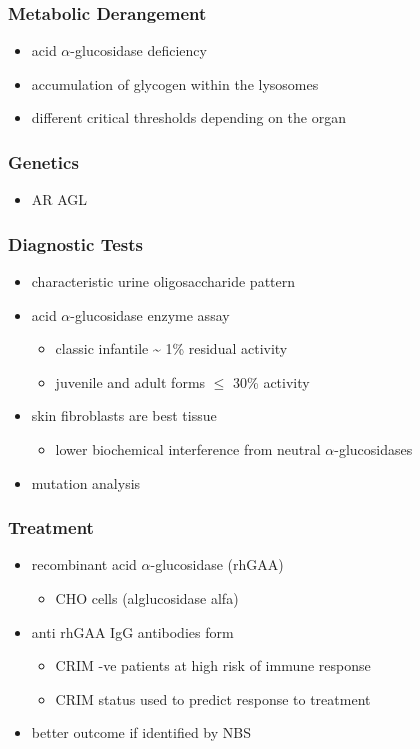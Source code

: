 \documentclass{scrartcl}
\begin{document}
\subsubsection{Metabolic Derangement}
\label{sec:orgab0d1dd}
\begin{itemize}
\item acid \(\alpha\)-glucosidase deficiency
\item accumulation of glycogen within the lysosomes
\item different critical thresholds depending on the organ
\end{itemize}
\subsubsection{Genetics}
\label{sec:orgeca71a3}
\begin{itemize}
\item AR AGL
\end{itemize}
\subsubsection{Diagnostic Tests}
\label{sec:org7264f06}
\begin{itemize}
\item characteristic urine oligosaccharide pattern
\item acid \(\alpha\)-glucosidase enzyme assay
\begin{itemize}
\item classic infantile \textasciitilde{} 1\% residual activity
\item juvenile and adult forms \(\le\) 30\% activity
\end{itemize}
\item skin fibroblasts are best tissue
\begin{itemize}
\item lower biochemical interference from neutral \(\alpha\)-glucosidases
\end{itemize}
\item mutation analysis
\end{itemize}
\subsubsection{Treatment}
\label{sec:org9c74d24}
\begin{itemize}
\item recombinant acid \(\alpha\)-glucosidase (rhGAA)
\begin{itemize}
\item CHO cells (alglucosidase alfa)
\end{itemize}
\item anti rhGAA IgG antibodies form
\begin{itemize}
\item CRIM -ve patients at high risk of immune response
\item CRIM status used to predict response to treatment
\end{itemize}
\item better outcome if identified by NBS
\end{itemize}
\end{document}
